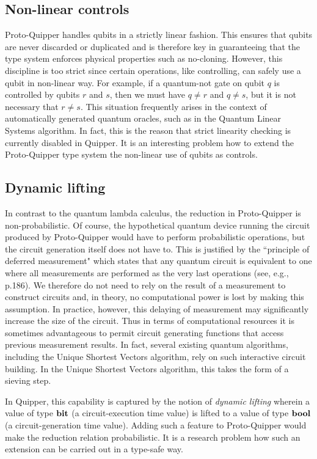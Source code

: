 \documentclass[twoside]{article}
\begin{document}
\subsection{Non-linear controls}

Proto-Quipper handles qubits in a strictly linear fashion. This
ensures that qubits are never discarded or duplicated and is therefore
key in guaranteeing that the type system enforces physical properties
such as no-cloning. However, this discipline is too strict since
certain operations, like controlling, can safely use a qubit in
non-linear way. For example, if a quantum-not gate on qubit $q$ is
controlled by qubits $r$ and $s$, then we must have $q\neq r$ and
$q\neq s$, but it is not necessary that $r\neq s$. This situation
frequently arises in the context of automatically generated quantum
oracles, such as in the Quantum Linear Systems algorithm. In fact,
this is the reason that strict linearity checking is currently
disabled in Quipper. It is an interesting problem how to extend the
Proto-Quipper type system the non-linear use of qubits as controls.

\subsection{Dynamic lifting}

In contrast to the quantum lambda calculus, the reduction in
Proto-Quipper is non-probabilistic. Of course, the hypothetical
quantum device running the circuit produced by Proto-Quipper would
have to perform probabilistic operations, but the circuit generation
itself does not have to. This is justified by the ``principle of
deferred measurement" which states that any quantum circuit is
equivalent to one where all measurements are performed as the very
last operations (see, e.g., \cite{NC02} p.186). We therefore do not
need to rely on the result of a measurement to construct circuits and,
in theory, no computational power is lost by making this
assumption. In practice, however, this delaying of measurement may
significantly increase the size of the circuit. Thus in terms of
computational resources it is sometimes advantageous to permit circuit
generating functions that access previous measurement results. In
fact, several existing quantum algorithms, including the Unique
Shortest Vectors algorithm, rely on such interactive circuit
building. In the Unique Shortest Vectors algorithm, this takes the
form of a sieving step. 

In Quipper, this capability is captured by the notion of \emph{dynamic
  lifting} wherein a value of type $\textrm{\bf bit}$ (a circuit-execution time
value) is lifted to a value of type $\textrm{\bf bool}$ (a circuit-generation time
value). Adding such a feature to Proto-Quipper would make the
reduction relation probabilistic. It is a research problem how such an
extension can be carried out in a type-safe way. 
\end{document}
